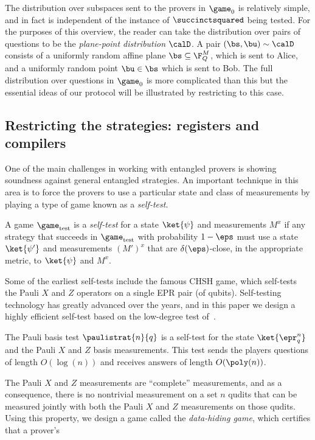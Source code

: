 The distribution over subspaces sent to the provers in $\game_0$ is
relatively simple, and in fact is independent of the instance of
$\succinctsquared$ being tested. For the purposes of this overview, the
reader can take the distribution over pairs of questions to be the
\emph{plane-point distribution} $\calD$. A pair $(\bs, \bu) \sim
\calD$ consists of a uniformly random affine plane $\bs \subseteq
\F_Q^M$, which is sent to Alice, and a uniformly random point $\bu
\in \bs$ which is sent to Bob. The full distribution over
questions in $\game_0$ is more complicated than this but the essential
ideas of our protocol will be illustrated by restricting to this case.
\subsection{Restricting the strategies: registers and compilers}
One of the main challenges in working with entangled provers is
showing soundness against general entangled strategies. An important
technique in this area is to force the provers to use a particular
state and class of measurements by playing a type of game known as a
\emph{self-test}.
\begin{infdef}
  A game $\game_{\mathrm{test}}$ is a \emph{self-test} for a state
  $\ket{\psi}$ and measurements $M^x$ if any strategy that succeeds in
  $\game_{\mathrm{test}}$ with probability $1- \eps$ must use a state
  $\ket{\psi'}$ and measurements $(M')^x$ that are
  $\delta(\eps)$-close, in the appropriate metric, to $\ket{\psi}$ and $M^x$.
\end{infdef}
Some of the earliest self-tests include the famous CHSH game, which
self-tests the Pauli $X$ and $Z$ operators on a single EPR pair (of
qubits). Self-testing technology has greatly advanced over the years,
and in this paper we design a highly efficient self-test based on the
low-degree test of~\cite{NV18a}.
\begin{infthm}
  The Pauli basis test $\paulistrat{n}{q}$ is a self-test for the
  state $\ket{\epr_q^n}$ and the Pauli $X$ and $Z$ basis
  measurements. This test sends the players questions of length
  $O(\log(n))$ and receives answers of length $O(\poly(n))$.
\end{infthm}
The Pauli $X$ and $Z$ measurements are ``complete'' measurements, and
as a consequence, there is no nontrivial measurement on a set $n$
qudits that can be measured jointly with both the Pauli $X$ and $Z$
measurements on those qudits. Using this property, we design a game
called the \emph{data-hiding game}, which certifies that a prover's

